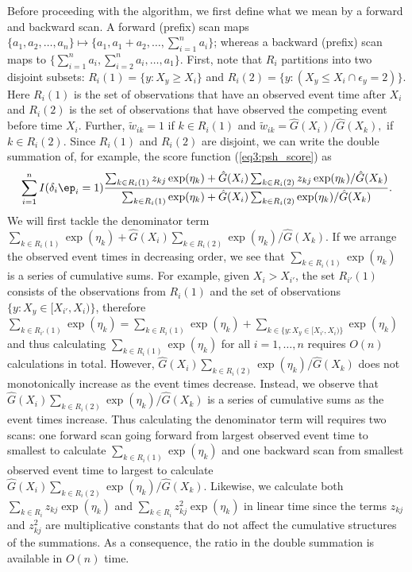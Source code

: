 Before proceeding with the algorithm, we first define what we mean by a forward and backward scan. A forward (prefix) scan maps $\{a_1, a_2, \ldots, a_n\} \mapsto \{a_1, a_1 + a_2, \ldots, \sum_{i=1}^n a_i\}$; whereas a backward (prefix) scan maps to $\{\sum_{i=1}^n a_i, \sum_{i=2}^n a_i, \ldots, a_1\}$. 
First, note that $R_i$ partitions into two disjoint subsets: $R_i(1) = \{y:X_y \geq X_i\}$ and $R_i(2) = \{y:(X_y \leq X_i \cap \epsilon_y =  2) \}$. Here $R_i(1)$ is the set of observations that have an observed event time after $X_i$ and $R_i(2)$ is the set of observations that have observed the competing event before time $X_i$. Further, $\tilde{w}_{ik} = 1$ if $k \in R_i(1)$ and $\tilde{w}_{ik} = \hat{G}(X_i) / \hat{G}(X_k),$ if $k \in R_i(2)$. Since $R_i(1)$ and $R_i(2)$ are disjoint, we can write the double summation of, for example, the score function (\ref{eq3:psh_score}) as
\begin{align}
\label{eq3:psh_score2}
\sum_{i = 1}^n I(\delta_i\ep_i = 1) \frac{ \sum_{k \in R_i(1)} z_{kj} \exp(\eta_k) +   \hat{G}(X_i)\sum_{k \in R_i(2)} z_{kj} \exp(\eta_k) / \hat{G}(X_k)}{\sum_{k \in R_i(1)} \exp(\eta_k) +  \hat{G}(X_i) \sum_{k \in R_i(2)} \exp(\eta_k) / \hat{G}(X_k)}. 
\end{align}
We will first tackle the denominator term $\sum_{k \in R_i(1)} \exp(\eta_k) +  \hat{G}(X_i) \sum_{k \in R_i(2)} \exp(\eta_k) / \hat{G}(X_k)$.
If we arrange the observed event times in decreasing order, we see that  $\sum_{k \in R_i(1)} \exp(\eta_k)$ is a series of cumulative sums. For example, given $X_i > X_{i'}$, the set $R_{i'}(1)$  consists of the observations from $R_i(1)$ and  the set of observations $\{y: X_y \in [X_{i'}, X_{i})\}$, therefore $\sum_{k \in R_{i'}(1)} \exp(\eta_k) = \sum_{k \in R_i(1)}  \exp(\eta_k) + \sum_{k \in \{y: X_y \in [X_{i'}, X_{i})\}} \exp(\eta_k)$ and  thus calculating $\sum_{k \in R_i(1)} \exp(\eta_k)$ for all $i = 1, \ldots, n$ requires $O(n)$ calculations in total. However, $ \hat{G}(X_i) \sum_{k \in R_i(2)} \exp(\eta_k) / \hat{G}(X_k)$ does not monotonically increase as the event times decrease. Instead, we observe that $ \hat{G}(X_i) \sum_{k \in R_i(2)} \exp(\eta_k) / \hat{G}(X_k)$  is a series of cumulative sums as the event times increase. Thus calculating the denominator term will requires two scans: one forward scan going forward from largest observed event time to smallest to calculate $\sum_{k \in R_i(1)} \exp(\eta_k) $ and one backward scan from smallest observed event time to largest to calculate $ \hat{G}(X_i) \sum_{k \in R_i(2)} \exp(\eta_k) / \hat{G}(X_k)$. Likewise, we calculate both $\sum_{k \in R_i} z_{kj} \exp(\eta_k)$ and $\sum_{k \in R_i} z_{kj}^2 \exp(\eta_k)$ in linear time since the terms $z_{kj}$ and $z_{kj}^2$ are multiplicative constants that do not affect the cumulative structures of the summations. As a consequence, the ratio in the double summation is available in $O(n)$ time.

